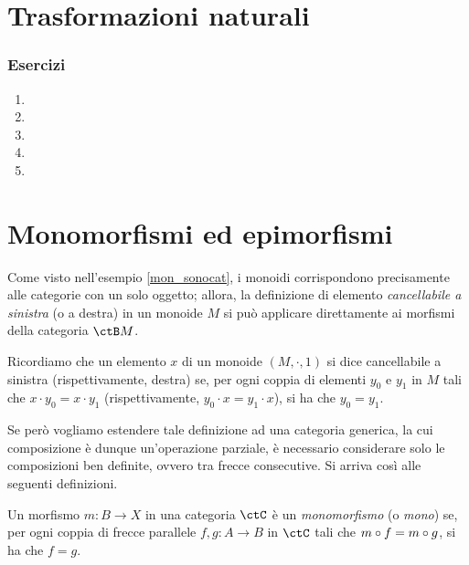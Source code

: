 \section{Trasformazioni naturali}\label{sec_tnat}
\subsubsection*{Esercizi}
\begin{enumerate}
	\item
	\item
	\item
	\item
	\item
\end{enumerate}
\section{Monomorfismi ed epimorfismi}\label{sec_monoepi}

Come visto nell'esempio \ref{mon_sonocat}, i monoidi corrispondono precisamente alle categorie con un solo oggetto; allora,
la definizione di elemento \emph{cancellabile a sinistra} (o a destra) in un monoide \(M\) si può applicare direttamente ai morfismi della categoria \(\ctB M\).

Ricordiamo che un elemento \(x\) di un monoide \((M, \cdot, 1)\) si dice cancellabile a sinistra (rispettivamente, destra) se,
per ogni coppia di elementi \(y_0\) e \(y_1\) in \(M\) tali che \(x \cdot y_0 = x \cdot y_1\) (rispettivamente, \(y_0 \cdot x = y_1 \cdot x\)), si ha che \(y_0 = y_1\).

Se però vogliamo estendere tale definizione ad una categoria generica,
la cui composizione è dunque un'operazione parziale,
è necessario considerare solo le composizioni ben definite, ovvero tra frecce consecutive.
Si arriva così alle seguenti definizioni.

\begin{definition}[Monomorfismo]\label{def_Mono}
	Un morfismo \(m \colon B \to X\) in una categoria \(\ctC\) è un \emph{monomorfismo} (o \emph{mono}) se,
	per ogni coppia di frecce parallele \(f, g \colon A \to B\) in \(\ctC\) tali che \(m \circ f = m \circ g\), si ha che \(f = g\).
\end{definition}

